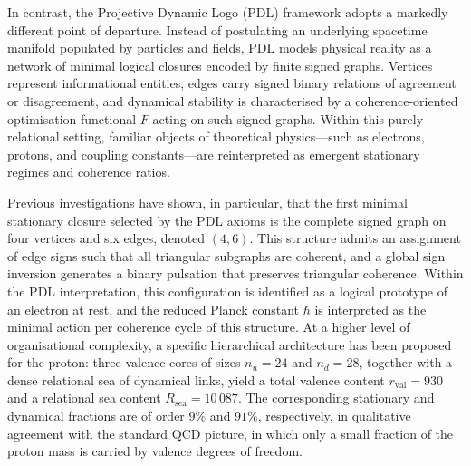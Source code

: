\documentclass[11pt,a4paper]{article}
\begin{document}
In contrast, the Projective Dynamic Logo (PDL) framework adopts a markedly different point of departure. Instead of postulating an underlying spacetime manifold populated by particles and fields, PDL models physical reality as a network of minimal logical closures encoded by finite signed graphs.\cite{Laubscher2026IntroPDL,Laubscher2026PDL_English,Laubscher2026LDP_French} Vertices represent informational entities, edges carry signed binary relations of agreement or disagreement, and dynamical stability is characterised by a coherence-oriented optimisation functional $F$ acting on such signed graphs. Within this purely relational setting, familiar objects of theoretical physics—such as electrons, protons, and coupling constants—are reinterpreted as emergent stationary regimes and coherence ratios.\par

Previous investigations have shown, in particular, that the first minimal stationary closure selected by the PDL axioms is the complete signed graph on four vertices and six edges, denoted $(4,6)$.\cite{Laubscher2026IntroPDL,Laubscher2026PDL_English} This structure admits an assignment of edge signs such that all triangular subgraphs are coherent, and a global sign inversion generates a binary pulsation that preserves triangular coherence. Within the PDL interpretation, this configuration is identified as a logical prototype of an electron at rest, and the reduced Planck constant $\hbar$ is interpreted as the minimal action per coherence cycle of this structure. At a higher level of organisational complexity, a specific hierarchical architecture has been proposed for the proton: three valence cores of sizes $n_u=24$ and $n_d=28$, together with a dense relational sea of dynamical links, yield a total valence content $r_{\mathrm{val}}=930$ and a relational sea content $R_{\mathrm{sea}}=10\,087$.\cite{Laubscher2026PDL_English,Laubscher2026LDP_French} The corresponding stationary and dynamical fractions are of order $9\%$ and $91\%$, respectively, in qualitative agreement with the standard QCD picture, in which only a small fraction of the proton mass is carried by valence degrees of freedom.\par
\end{document}
